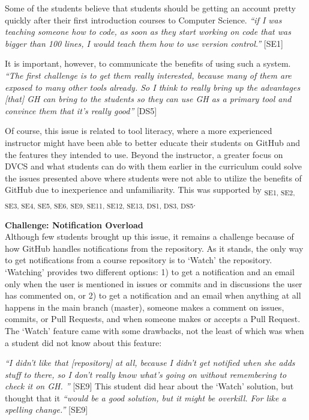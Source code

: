 Some of the students believe that students should be getting an account pretty quickly after their first introduction courses to Computer Science. \textit{``if I was teaching someone how to code, as soon as they start working on code that was bigger than 100 lines, I would teach them how to use version control.''} [SE1]


It is important, however, to communicate the benefits of using such a system. \textit{``The first challenge is to get them really interested, because many of them are exposed to many other tools already. So I think to really bring up the advantages [that] GH can bring to the students so they can use GH as a primary tool and convince them that it's really good''} [DS5]

Of course, this issue is related to tool literacy, where a more experienced instructor might have been able to better educate their students on GitHub and the features they intended to use. Beyond the instructor, a greater focus on DVCS and what students can do with them earlier in the curriculum could solve the issues presented above where students were not able to utilize the benefits of GitHub due to inexperience and unfamiliarity. This was supported by \textsubscript{SE1, SE2, SE3, SE4, SE5, SE6, SE9, SE11, SE12, SE13, DS1, DS3, DS5}.

\textbf{Challenge: Notification Overload} \\
Although few students brought up this issue, it remains a challenge because of how GitHub handles notifications from the repository. As it stands, the only way to get notifications from a course repository is to `Watch' the repository. `Watching' provides two different options: 1) to get a notification and an email only when the user is mentioned in issues or commits and in discussions the user has commented on, or 2) to get a notification and an email when anything at all happens in the main branch (master), someone makes a comment on issues, commits, or Pull Requests, and when someone makes or accepts a Pull Request. The `Watch' feature came with some drawbacks, not the least of which was when a student did not know about this feature:

\textit{``I didn't like that [repository] at all, because I didn't get notified when she adds stuff to there, so I don't really know what's going on without remembering to check it on GH. ''} [SE9] This student did hear about the `Watch' solution, but thought that it \textit{``would be a good solution, but it might be overkill. For like a spelling change.''} [SE9]

